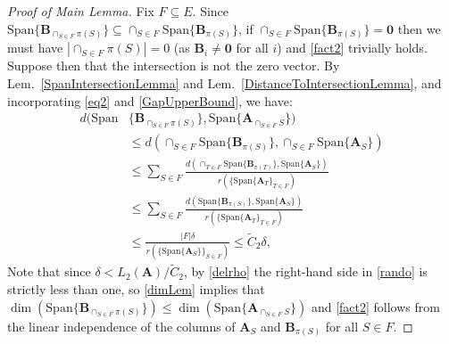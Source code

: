 \documentclass[9pt,twocolumn]{pnas-new}
\begin{document}
\begin{proof}[Proof of Main Lemma]
Fix $F \subseteq E$. Since $\text{Span}\{\mathbf{B}_{\cap_{S \in F}\pi(S)}\} \subseteq \cap_{S \in F} \text{Span}\{\mathbf{B}_{\pi(S)}\}$, if $\cap_{S \in F} \text{Span}\{\mathbf{B}_{\pi(S)}\} = \textbf{0}$ then we must have $|\cap_{S \in F} \pi(S)| = 0$ (as $\mathbf{B}_i \neq \textbf{0}$ for all $i$) and \eqref{fact2} trivially holds. Suppose then that the intersection is not the zero vector. By Lem.~\ref{SpanIntersectionLemma} and Lem.~\ref{DistanceToIntersectionLemma}, and incorporating \eqref{eq2} and \eqref{GapUpperBound}, we have:
\begin{align}\label{randoml}
d( \text{Span}&\{\mathbf{B}_{\cap_{S \in F}\pi(S)}\}, \text{Span}\{\mathbf{A}_{\cap_{S \in F} S}\}  ) \nonumber \\
&\leq d\left( \cap_{S \in F} \text{Span}\{\mathbf{B}_{\pi(S)}\}, \cap_{S \in F} \text{Span}\{\mathbf{A}_{S}\} \right) \nonumber \\
&\leq \sum_{S \in F} \frac{ d\left( \cap_{T \in F} \text{Span}\{\mathbf{B}_{\pi(T)}\},\text{Span}\{\mathbf{A}_{S}\} \right) }{ r( \{ \text{Span}\{\mathbf{A}_{T}\}_{T \in F}) } \nonumber \\
&\leq \sum_{S \in F} \frac{ d\left( \text{Span}\{\mathbf{B}_{\pi(S)}\},\text{Span}\{\mathbf{A}_{S}\} \right) }{ r( \{ \text{Span}\{\mathbf{A}_{T}\}_{T \in F}) }\nonumber \\
&\leq \frac{|F| \delta}{r( \{ \text{Span}\{\mathbf{A}_{S}\} \}_{S \in F})} 
\leq \tilde C_2 \delta, 
\end{align}
%
Note that since $\delta < L_2(\mathbf{A}) / \tilde C_2$, by \eqref{delrho} the right-hand side in \eqref{rando} is strictly less than one, so \eqref{dimLem} implies that $\dim(\text{Span}\{\mathbf{B}_{\cap_{S \in F}\pi(S)}\}) \leq \dim(\text{Span}\{\mathbf{A}_{\cap_{S \in F} S}\})$ and \eqref{fact2} follows from the linear independence of the columns of $\mathbf{A}_{S}$ and $\mathbf{B}_{\pi(S)}$ for all $S \in F$.


\end{proof}
\end{document}
